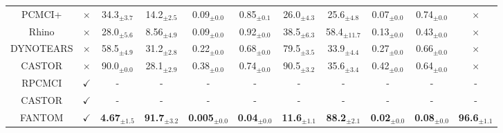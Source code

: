 \begin{table}[H]
{\begin{tabular}{@{}cccccccccc|c@{}}
PCMCI+ & \multicolumn{1}{c|}{$\times$}   & 34.3$_{\pm3.7}$ & 14.2$_{\pm2.5}$ & 0.09$_{\pm0.0}$ & 0.85$_{\pm0.1}$ & 26.0$_{\pm4.3}$ & 25.6$_{\pm4.8}$ & 0.07$_{\pm0.0}$ & 0.74$_{\pm0.0}$ & $\times$ \\
    Rhino & \multicolumn{1}{c|}{$\times$}  & 28.0$_{\pm5.6}$ & 8.56$_{\pm4.9}$ & 0.09$_{\pm0.0}$ & 0.92$_{\pm0.0}$ & 38.5$_{\pm6.3}$ & 58.4$_{\pm11.7}$ & 0.13$_{\pm0.0}$ & 0.43$_{\pm0.0}$ & $\times$ \\
    DYNOTEARS & \multicolumn{1}{c|}{$\times$} & 58.5$_{\pm4.9}$ & 31.2$_{\pm2.8}$ & 0.22$_{\pm0.0}$ & 0.68$_{\pm0.0}$ & 79.5$_{\pm3.5}$ & 33.9$_{\pm4.4}$ & 0.27$_{\pm0.0}$ & 0.66$_{\pm0.0}$ & $\times$  \\
    CASTOR & \multicolumn{1}{c|}{$\times$} &  90.0$_{\pm0.0}$ & 28.1$_{\pm2.9}$ & 0.38$_{\pm0.0}$ & 0.74$_{\pm0.0}$ & 90.5$_{\pm3.2}$ & 35.6$_{\pm3.4}$ & 0.42$_{\pm0.0}$ & 0.64$_{\pm0.0}$ & $\times$  \\
    \midrule
    RPCMCI & \multicolumn{1}{c|}{$\checkmark$} &  - & - & - & - & - & - & - & - & -  \\
    CASTOR & \multicolumn{1}{c|}{$\checkmark$} &  - & - & - & - & - & - & - & - & -  \\
\rowcolor{gray!20} FANTOM                 & \multicolumn{1}{c|}{$\checkmark$}           & \textbf{4.67}$_{\pm1.5}$ & \textbf{91.7}$_{\pm3.2}$                                   & \textbf{0.005}$_{\pm0.0}$                                                 & \textbf{0.04}$_{\pm0.0}$                                                   & \textbf{11.6}$_{\pm1.1}$ & \textbf{88.2}$_{\pm2.1}$                                   & \textbf{0.02}$_{\pm0.0}$                                                 & \multicolumn{1}{c|}{\textbf{0.08}$_{\pm0.0}$}                                                   & \textbf{96.6}$_{\pm1.1}$ \\ \bottomrule
\end{tabular}}
\end{table}

